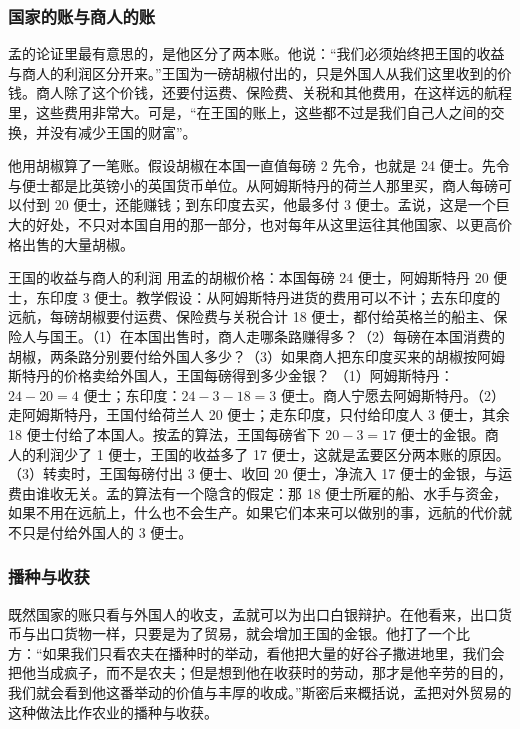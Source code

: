 \subsubsection{国家的账与商人的账}
孟的论证里最有意思的，是他区分了两本账。他说：“我们必须始终把王国的收益与商人的利润区分开来。”王国为一磅胡椒付出的，只是外国人从我们这里收到的价钱。商人除了这个价钱，还要付运费、保险费、关税和其他费用，在这样远的航程里，这些费用非常大。可是，“在王国的账上，这些都不过是我们自己人之间的交换，并没有减少王国的财富”\cite{mun1664}。

他用胡椒算了一笔账。假设胡椒在本国一直值每磅 2 先令，也就是 24 便士。先令与便士都是比英镑小的英国货币单位。从阿姆斯特丹的荷兰人那里买，商人每磅可以付到 20 便士，还能赚钱；到东印度去买，他最多付 3 便士\cite{mun1664}。孟说，这是一个巨大的好处，不只对本国自用的那一部分，也对每年从这里运往其他国家、以更高价格出售的大量胡椒\cite{mun1664}。

\begin{example}{王国的收益与商人的利润}\label{ex:merc-mun}
用孟的胡椒价格：本国每磅 24 便士，阿姆斯特丹 20 便士，东印度 3 便士\cite{mun1664}。教学假设：从阿姆斯特丹进货的费用可以不计；去东印度的远航，每磅胡椒要付运费、保险费与关税合计 18 便士，都付给英格兰的船主、保险人与国王。（1）在本国出售时，商人走哪条路赚得多？（2）每磅在本国消费的胡椒，两条路分别要付给外国人多少？（3）如果商人把东印度买来的胡椒按阿姆斯特丹的价格卖给外国人，王国每磅得到多少金银？
\solution （1）阿姆斯特丹：$24-20=4$ 便士；东印度：$24-3-18=3$ 便士。商人宁愿去阿姆斯特丹。（2）走阿姆斯特丹，王国付给荷兰人 20 便士；走东印度，只付给印度人 3 便士，其余 18 便士付给了本国人。按孟的算法，王国每磅省下 $20-3=17$ 便士的金银。商人的利润少了 1 便士，王国的收益多了 17 便士，这就是孟要区分两本账的原因。（3）转卖时，王国每磅付出 3 便士、收回 20 便士，净流入 17 便士的金银，与运费由谁收无关。孟的算法有一个隐含的假定：那 18 便士所雇的船、水手与资金，如果不用在远航上，什么也不会生产。如果它们本来可以做别的事，远航的代价就不只是付给外国人的 3 便士。
\end{example}

\subsubsection{播种与收获}
既然国家的账只看与外国人的收支，孟就可以为出口白银辩护。在他看来，出口货币与出口货物一样，只要是为了贸易，就会增加王国的金银\cite{mun1664}。他打了一个比方：“如果我们只看农夫在播种时的举动，看他把大量的好谷子撒进地里，我们会把他当成疯子，而不是农夫；但是想到他在收获时的劳动，那才是他辛劳的目的，我们就会看到他这番举动的价值与丰厚的收成。”\cite{mun1664}斯密后来概括说，孟把对外贸易的这种做法比作农业的播种与收获\cite{smith1776}。

